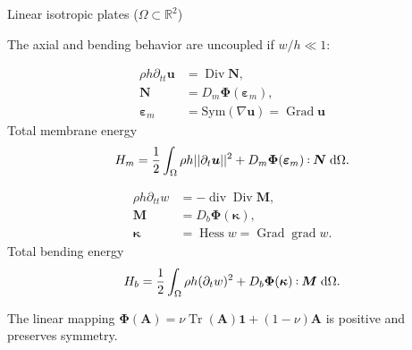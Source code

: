 \documentclass[aspectratio=169]{beamer}
\DeclareMathOperator*{\grad}{grad}
\DeclareMathOperator*{\Grad}{Grad}
\DeclareMathOperator*{\Div}{Div}
\renewcommand{\div}{\operatorname{div}}
\DeclareMathOperator*{\Hess}{Hess}
\DeclareMathOperator{\Tr}{Tr}
\newcommand{\bbR}{\mathbb{R}}
\def\onedot{$\mathsurround0pt\ldotp$}
\def\cddot{%
	\mathbin{\vcenter{\baselineskip.67ex
			\hbox{\onedot}\hbox{\onedot}}%
}}
\begin{document}
\begin{frame}{Linear isotropic plates ($\Omega \subset \bbR^2$)}
	
	The axial and bending behavior are uncoupled if $w/h \ll 1$:
	
	\begin{tcbraster}[raster columns=2, raster equal height]
		\begin{tcolorbox}[width=0.49\textwidth, nobeforeafter,  colframe=theme,title=Membrane displacement \\
			(2D elastodynamics)]%
			\begin{equation*}
				\begin{aligned}
				\rho h \partial_{tt} \bm{u} &= \Div \bm{N}, \\
				\bm{N}&=D_m\bm{\Phi}(\bm{\varepsilon}_m), \\
				\bm{\varepsilon}_m &= \mathrm{Sym}(\nabla \bm{u}) = \Grad \bm{u}
				\end{aligned} 
			\end{equation*}
		Total membrane energy
		\begin{equation*}
			\small
			H_m= \frac{1}{2} \int_{\Omega} \rho h ||\partial_t \bm{u}||^2  + D_m \bm{\Phi}(\bm{\varepsilon}_m) \cddot \bm{N} \d\Omega.
		\end{equation*}
		\end{tcolorbox}
		\begin{tcolorbox}[width=0.49\textwidth, nobeforeafter,  colframe=theme,title=Vertical displacement\\ (Kirchhoff plate)]%
		\begin{equation*}
			\begin{aligned}
				\rho h \partial_{tt} w &= -\div\Div \bm{M}, \\
				\bm{M} &= D_b \bm{\Phi}(\bm{\kappa}), \\
				\bm{\kappa}&= \Hess w = \Grad \grad w. 
			\end{aligned}
		\end{equation*}
		Total bending energy
		\begin{equation*}
			\small
			H_b = \frac{1}{2} \int_{\Omega} \rho h (\partial_t w)^2 + D_b \bm{\Phi}(\bm{\kappa}) \cddot \bm{M} \d\Omega.
		\end{equation*}
		\end{tcolorbox}
	\end{tcbraster}
	
	The linear mapping $\bm\Phi (\bm{A}) = \nu \Tr(\bm{A})\bm{1} + (1 - \nu) \bm{A}$ is positive and preserves symmetry.
	
\end{frame}
\end{document}
